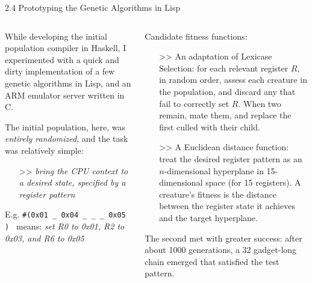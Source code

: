 \documentclass[9pt]{beamer}
\begin{document}
\begin{frame}{2.4 Prototyping the Genetic Algorithms in Lisp}

\begin{columns}
\begin{column}{.45\textwidth}
While developing the initial population compiler in Haskell, I experimented with a quick and dirty implementation of a few genetic algorithms in Lisp, and an ARM emulator server written in C.

\vspace{.15cm}


The initial population, here, was \emph{entirely randomized}, and the task was relatively simple: 
\vspace{.25cm}
\begin{itemize}
\item[>>] \emph{bring the CPU context to a desired state, specified by a register pattern}
\end{itemize}
\vspace{.25cm}
{\small E.g.  \texttt{\#(0x01 \_ 0x04 \_ \_ \_ 0x05 ) } 
means: \emph{set R0 to 0x01, R2 to 0x03, and R6 to 0x05}}

\end{column}
\begin{column}{.55\textwidth}
Candidate fitness functions:
\begin{itemize}
\item[>>] {\small An adaptation of Lexicase Selection: for each relevant register $R$, in random order, assess each creature in the population, and discard any that fail to correctly set $R$. When two remain, mate them, and replace the first culled with their child.}
\item[>>] {\small A Euclidean distance function: treat the desired register pattern as an $n$-dimensional hyperplane in 15-dimensional space (for 15 registers). A creature's fitness is the distance between the register state it achieves and the target hyperplane.}
\end{itemize}
{\small The second met with greater success: after about 1000 generations, a 32 gadget-long chain emerged that satisfied the test pattern. }
\end{column}
\end{columns}
    
\end{frame}
\end{document}
